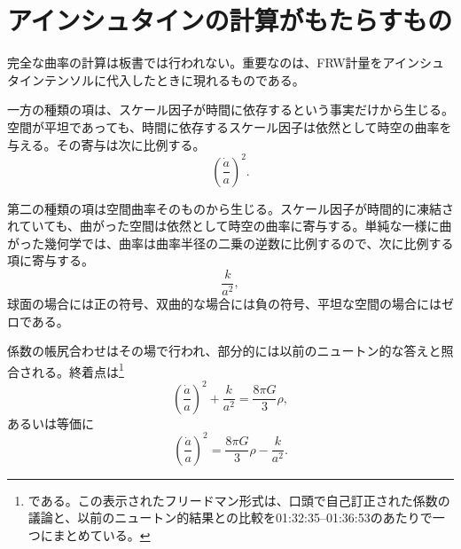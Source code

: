 \begin{classroomqa}
\end{classroomqa}

\section{アインシュタインの計算がもたらすもの}

完全な曲率の計算は板書では行われない。重要なのは、FRW計量をアインシュタインテンソルに代入したときに現れるものである。

一方の種類の項は、スケール因子が時間に依存するという事実だけから生じる。空間が平坦であっても、時間に依存するスケール因子は依然として時空の曲率を与える。その寄与は次に比例する。
\begin{equation}
\left(\frac{\dot a}{a}\right)^2.
\end{equation}

第二の種類の項は空間曲率そのものから生じる。スケール因子が時間的に凍結されていても、曲がった空間は依然として時空の曲率に寄与する。単純な一様に曲がった幾何学では、曲率は曲率半径の二乗の逆数に比例するので、次に比例する項に寄与する。
\begin{equation}
\frac{k}{a^2},
\end{equation}
球面の場合には正の符号、双曲的な場合には負の符号、平坦な空間の場合にはゼロである。

\begin{classroomqa}
\end{classroomqa}

係数の帳尻合わせはその場で行われ、部分的には以前のニュートン的な答えと照合される。終着点は\footnote{である。この表示されたフリードマン形式は、口頭で自己訂正された係数の議論と、以前のニュートン的結果との比較を01:32:35--01:36:53のあたりで一つにまとめている。}
\begin{equation}
\left(\frac{\dot a}{a}\right)^2+\frac{k}{a^2}=\frac{8\pi G}{3}\rho,
\end{equation}
あるいは等価に
\begin{equation}
\left(\frac{\dot a}{a}\right)^2=\frac{8\pi G}{3}\rho-\frac{k}{a^2}.
\end{equation}

